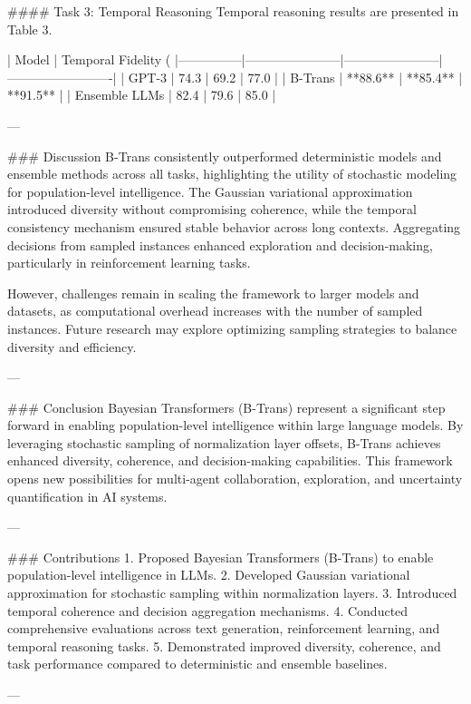 #### Task 3: Temporal Reasoning  
Temporal reasoning results are presented in Table 3.

| Model         | Temporal Fidelity (%
|---------------|-----------------------|-----------------------|-------------------------|
| GPT-3         | 74.3                 | 69.2                 | 77.0                   |
| B-Trans       | **88.6**             | **85.4**             | **91.5**               |
| Ensemble LLMs | 82.4                 | 79.6                 | 85.0                   |

---

### Discussion  
B-Trans consistently outperformed deterministic models and ensemble methods across all tasks, highlighting the utility of stochastic modeling for population-level intelligence. The Gaussian variational approximation introduced diversity without compromising coherence, while the temporal consistency mechanism ensured stable behavior across long contexts. Aggregating decisions from sampled instances enhanced exploration and decision-making, particularly in reinforcement learning tasks.

However, challenges remain in scaling the framework to larger models and datasets, as computational overhead increases with the number of sampled instances. Future research may explore optimizing sampling strategies to balance diversity and efficiency.

---

### Conclusion  
Bayesian Transformers (B-Trans) represent a significant step forward in enabling population-level intelligence within large language models. By leveraging stochastic sampling of normalization layer offsets, B-Trans achieves enhanced diversity, coherence, and decision-making capabilities. This framework opens new possibilities for multi-agent collaboration, exploration, and uncertainty quantification in AI systems.

---

### Contributions  
1. Proposed Bayesian Transformers (B-Trans) to enable population-level intelligence in LLMs.  
2. Developed Gaussian variational approximation for stochastic sampling within normalization layers.  
3. Introduced temporal coherence and decision aggregation mechanisms.  
4. Conducted comprehensive evaluations across text generation, reinforcement learning, and temporal reasoning tasks.  
5. Demonstrated improved diversity, coherence, and task performance compared to deterministic and ensemble baselines.  

--- 
